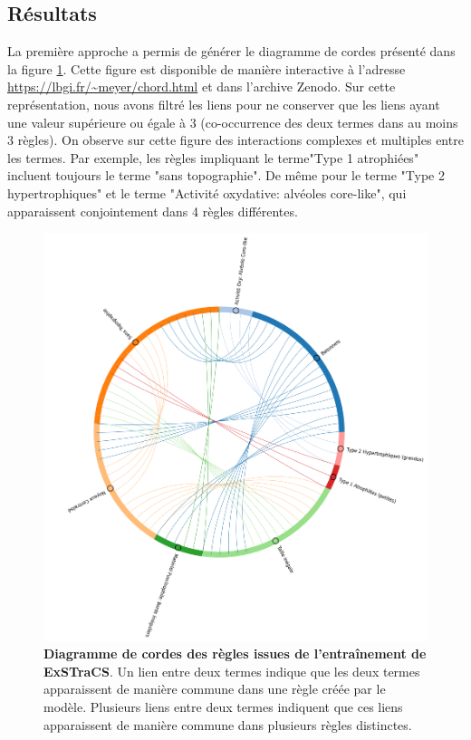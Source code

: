 \subsection{Résultats}
La première approche a permis de générer le diagramme de cordes présenté dans la figure \ref{fig:chords}.  Cette figure est disponible de manière interactive à l'adresse \url{https://lbgi.fr/~meyer/chord.html}  et dans l'archive Zenodo. Sur cette représentation, nous avons filtré les liens pour ne conserver que les liens ayant une valeur supérieure ou égale à 3 (co-occurrence des deux termes dans au moins 3 règles). On observe sur cette figure des interactions complexes et multiples entre les termes. Par exemple, les règles impliquant le terme"Type 1 atrophiées" incluent toujours le terme "sans topographie". De même pour le terme "Type 2 hypertrophiques" et le terme "Activité oxydative: alvéoles core-like", qui apparaissent conjointement dans 4 règles différentes.
\begin{figure}[H]
  \centering
  \includegraphics[width=1\textwidth]{figures/chord_plot.png}
  \caption[Diagramme de cordes des règles issues de l'entrainement de ExSTraCS]{\textbf{Diagramme de cordes des règles issues de l'entraînement de ExSTraCS}. Un lien entre deux termes indique que les deux termes apparaissent de manière commune dans une règle créée par le modèle. Plusieurs liens entre deux termes indiquent que ces liens apparaissent de manière commune dans plusieurs règles distinctes.}
  \label{fig:chords}
\end{figure}
